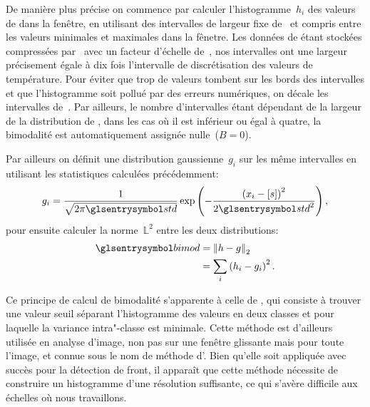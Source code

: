 De manière plus précise on commence par calculer l'histogramme~\(h_i\) des valeurs de  dans la fenêtre, en utilisant des intervalles de largeur fixe de~ et compris entre les valeurs minimales et maximales dans la fênetre.
Les données de  étant stockées compressées par \footnotemark\ avec un facteur d'échelle de~, nos intervalles ont une largeur précisement égale à dix fois l'intervalle de discrétisation des valeurs de température.
Pour éviter que trop de valeurs tombent sur les bords des intervalles et que l'histogramme soit pollué par des erreurs numériques, on décale les intervalles de~.
Par ailleurs, le nombre d'intervalles étant dépendant de la largeur de la distribution de , dans les cas où il est inférieur ou égal à quatre, la bimodalité est automatiquement assignée nulle~(\(B=0\)).

Par ailleurs on définit une distribution gaussienne~\(g_i\) sur les même intervalles en utilisant les statistiques calculées précédemment:
\begin{equation}
  g_i = \frac{1}{\sqrt{2\pi\am{std}}} \exp\paren{-\frac{\paren{x_i-\moy{s}}^2}{2\am{std}^2}},
\end{equation}
pour ensuite calculer la norme~\(\mathbb{L}^2\) entre les deux distributions:
\begin{equation}
  \begin{split}
  \am{bimod} & = \norme[2]{h - g}\\
             & = \sum_i \paren{h_i - g_i}^2 .
  \end{split}
\end{equation}

Ce principe de calcul de bimodalité s'apparente à celle de \textcite{cayula_1992}, qui consiste à trouver une valeur seuil séparant l'histogramme des valeurs en deux classes et pour laquelle la variance intra"-classe est minimale.
Cette méthode est d'ailleurs utilisée en analyse d'image, non pas sur une fenêtre glissante mais pour toute l'image, et connue sous le nom de méthode d'\textcite{otsu_1979}.
Bien qu'elle soit appliquée avec succès pour la détection de front, il apparaît que cette méthode nécessite de construire un histogramme d'une résolution suffisante, ce qui s'avère difficile aux échelles où nous travaillons.

